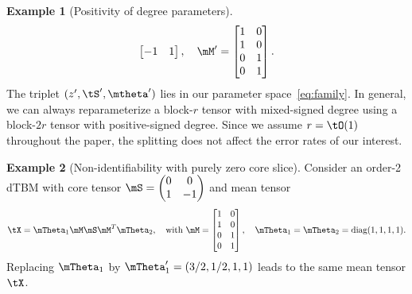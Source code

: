 \documentclass[lettersize,onecolumn,journal]{IEEEtran}
\theoremstyle{definition}
\theoremstyle{definition}
\newtheorem{example}{Example}
\begin{document}
\begin{example}[Positivity of degree parameters]
\begin{equation}
\begin{bmatrix}
    -1 & 1
    \end{bmatrix}, \quad \mM' = \begin{bmatrix}
   1 & 0 \\
   1 &0 \\
    0 & 1 \\
    0&1
    \end{bmatrix}.
\end{equation}
 The triplet $(z',\tS', \mtheta')$ lies in our parameter space~\eqref{eq:family}. In general, we can always reparameterize a block-$r$ tensor with mixed-signed degree using a block-$2r$ tensor with positive-signed degree. Since we assume $r=\tO(1)$ throughout the paper, the splitting does not affect the error rates of our interest.\end{example}
 
 {
  
    \begin{example}[Non-identifiability with purely zero core slice]\label{example:c3} 
 Consider an order-2 dTBM with core tensor $\mS = \begin{pmatrix} 0 & 0\\
    1 & -1
    \end{pmatrix}$ and mean tensor 
    \begin{equation}
        \tX =  \mTheta_1 \mM \mS   \mM^T \mTheta_2, \quad \text{with } \mM = \begin{bmatrix} 1 & 0 \\
        1 & 0 \\
        0 & 1 \\
        0 & 1 \\
        \end{bmatrix}, \quad \mTheta_1 =\mTheta_2= \text{diag}(1,1,1,1).
    \end{equation}
Replacing $\mTheta_1$ by $\mTheta'_1 = (3/2, 1/2, 1,1)$ leads to the same mean tensor $\tX$. 
\end{example}
 
 
     \begin{table}[h]
    \centering
    \caption{Parameter space comparison between previous work with our assumption.}
    \label{tab:para}
\end{table}
 }
\end{document}
